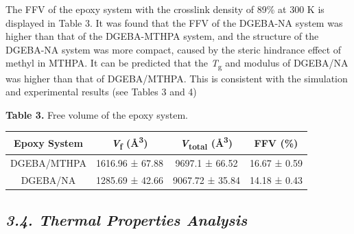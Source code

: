 \documentclass{article}
\begin{document}
The FFV of the epoxy system with the crosslink density of 89\% at 300 K is displayed in Table 3. It was found that the FFV of the DGEBA-NA system was higher than that of the DGEBA-MTHPA system, and the structure of the DGEBA-NA system was more compact, caused by the steric hindrance effect of methyl in MTHPA. It can be predicted that the \emph{T}\textsubscript{g} and modulus of DGEBA/NA was higher than that of DGEBA/MTHPA. This is consistent with the simulation and experimental results (see Tables 3 and 4)

\begin{center}
\noindent\textbf{Table 3.} Free volume of the epoxy system.

\smallskip
\begin{tabular}{cccc}
\toprule
\textbf{Epoxy System} & \textbf{\emph{V}\textsubscript{f} (Å\textsuperscript{3})} & \textbf{\emph{V}\textsubscript{total} (Å\textsuperscript{3})} & \textbf{FFV (\%)} \\
\midrule
DGEBA/MTHPA & 1616.96 ± 67.88 & 9697.1 ± 66.52 & 16.67 ± 0.59 \\
DGEBA/NA & 1285.69 ± 42.66 & 9067.72 ± 35.84 & 14.18 ± 0.43 \\
\bottomrule
\end{tabular}
\end{center}

\subsection*{\emph{3.4. Thermal Properties Analysis}}
\end{document}
